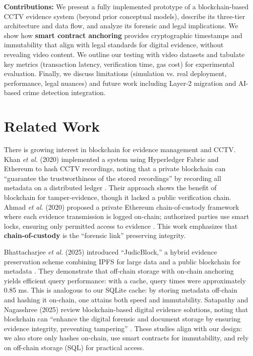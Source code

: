 \documentclass[conference]{IEEEtran}
\begin{document}
\textbf{Contributions:} We present a fully implemented prototype of a blockchain-based CCTV evidence system (beyond prior conceptual models), describe its three-tier architecture and data flow, and analyze its forensic and legal implications. We show how \textbf{smart contract anchoring} provides cryptographic timestamps and immutability that align with legal standards for digital evidence, without revealing video content. We outline our testing with video datasets and tabulate key metrics (transaction latency, verification time, gas cost) for experimental evaluation. Finally, we discuss limitations (simulation vs. real deployment, performance, legal nuances) and future work including Layer-2 migration and AI-based crime detection integration.

\section{Related Work}

There is growing interest in blockchain for evidence management and CCTV. Khan \textit{et al.} (2020) implemented a system using Hyperledger Fabric and Ethereum to hash CCTV recordings, noting that a private blockchain can ``guarantee the trustworthiness of the stored recordings'' by recording all metadata on a distributed ledger \cite{b1}. Their approach shows the benefit of blockchain for tamper-evidence, though it lacked a public verification chain. Ahmad \textit{et al.} (2020) proposed a private Ethereum chain-of-custody framework where each evidence transmission is logged on-chain; authorized parties use smart locks, ensuring only permitted access to evidence \cite{b2}. This work emphasizes that \textbf{chain-of-custody} is the ``forensic link'' preserving integrity.

Bhattacharjee \textit{et al.} (2025) introduced ``JudicBlock,'' a hybrid evidence preservation scheme combining IPFS for large data and a public blockchain for metadata \cite{b3}. They demonstrate that off-chain storage with on-chain anchoring yields efficient query performance: with a cache, query times were approximately 0.85 ms. This is analogous to our SQLite cache: by storing metadata off-chain and hashing it on-chain, one attains both speed and immutability. Satapathy and Nagasshree (2025) review blockchain-based digital evidence solutions, noting that blockchain can ``enhance the digital forensic and document storage by ensuring evidence integrity, preventing tampering'' \cite{b6}. These studies align with our design: we also store only hashes on-chain, use smart contracts for immutability, and rely on off-chain storage (SQL) for practical access.
\end{document}
